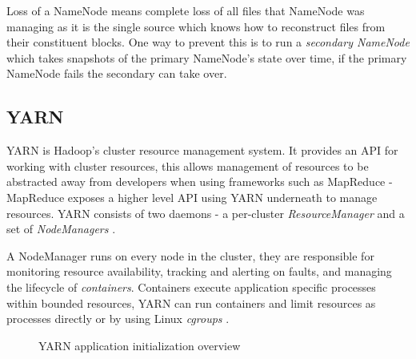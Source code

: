 \documentclass[conference]{IEEEtran}
\begin{document}
Loss of a NameNode means complete loss of all files that NameNode was managing as it is the single source which knows how to reconstruct files from their constituent blocks. One way to prevent this is to run a \emph{secondary NameNode} \cite{secnamenode} which takes snapshots of the primary NameNode's state over time, if the primary NameNode fails the secondary can take over.

\subsection{YARN}
YARN is Hadoop's cluster resource management system. It provides an API for working with cluster resources, this allows management of resources to be abstracted away from developers when using frameworks such as MapReduce - MapReduce exposes a higher level API using YARN underneath to manage resources. YARN consists of two daemons - a per-cluster \emph{ResourceManager} and a set of \emph{NodeManagers} \cite{yarn}.

A NodeManager runs on every node in the cluster, they are responsible for monitoring resource availability, tracking and alerting on faults, and managing the lifecycle of \emph{containers}. Containers execute application specific processes within bounded resources, YARN can run containers and limit resources as processes directly or by using Linux \emph{cgroups} \cite{yarncgroups}.

\begin{figure}[ht]
\centering
{}
\caption{YARN application initialization overview}
\label{yarn}
\end{figure}
\end{document}

